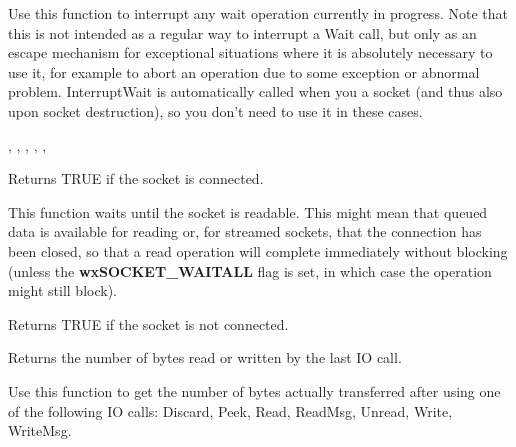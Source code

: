 
Use this function to interrupt any wait operation currently in progress.
Note that this is not intended as a regular way to interrupt a Wait call,
but only as an escape mechanism for exceptional situations where it is
absolutely necessary to use it, for example to abort an operation due to
some exception or abnormal problem. InterruptWait is automatically called
when you  a socket (and thus also upon
socket destruction), so you don't need to use it in these cases.

, 
, 
, 
, 
, 

%
%
\label{wxsocketbaseisconnected}


Returns TRUE if the socket is connected.

%
%
\label{wxsocketbaseisdata}


This function waits until the socket is readable. This might mean that
queued data is available for reading or, for streamed sockets, that
the connection has been closed, so that a read operation will complete
immediately without blocking (unless the {\bf wxSOCKET\_WAITALL} flag
is set, in which case the operation might still block).

\label{wxsocketbaseisdisconnected}

%
%

Returns TRUE if the socket is not connected.

\label{wxsocketbaselastcount}

%
%

Returns the number of bytes read or written by the last IO call.

Use this function to get the number of bytes actually transferred
after using one of the following IO calls: Discard, Peek, Read,
ReadMsg, Unread, Write, WriteMsg.

